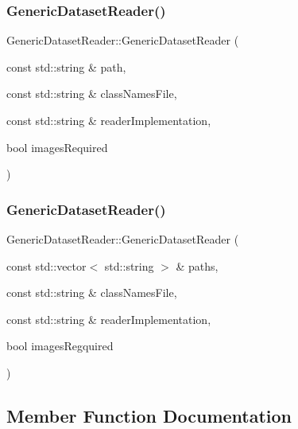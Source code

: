 \subsubsection{\texorpdfstring{Generic\+Dataset\+Reader()}{GenericDatasetReader()}\hspace{0.1cm}{\footnotesize\ttfamily [1/2]}}
{\footnotesize\ttfamily Generic\+Dataset\+Reader\+::\+Generic\+Dataset\+Reader (\begin{DoxyParamCaption}\item[{const std\+::string \&}]{path,  }\item[{const std\+::string \&}]{class\+Names\+File,  }\item[{const std\+::string \&}]{reader\+Implementation,  }\item[{bool}]{images\+Required }\end{DoxyParamCaption})}

\mbox{\label{class_generic_dataset_reader_a1fc3abcead6cd89fc263817111d6088e}} 
\subsubsection{\texorpdfstring{Generic\+Dataset\+Reader()}{GenericDatasetReader()}\hspace{0.1cm}{\footnotesize\ttfamily [2/2]}}
{\footnotesize\ttfamily Generic\+Dataset\+Reader\+::\+Generic\+Dataset\+Reader (\begin{DoxyParamCaption}\item[{const std\+::vector$<$ std\+::string $>$ \&}]{paths,  }\item[{const std\+::string \&}]{class\+Names\+File,  }\item[{const std\+::string \&}]{reader\+Implementation,  }\item[{bool}]{images\+Regquired }\end{DoxyParamCaption})}



\subsection{Member Function Documentation}
\mbox{\label{class_generic_dataset_reader_a61027ae03b1fcf92eee88c95eb8740a0}} 
